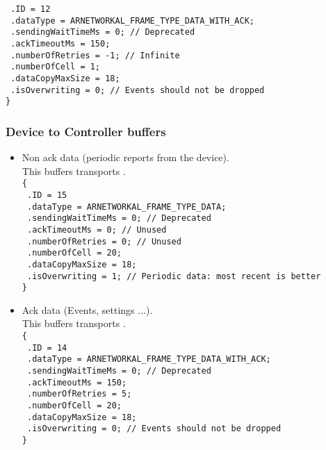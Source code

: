 \begin{itemize}
{    \texttt{  .ID = 12}\\
    \texttt{  .dataType = ARNETWORKAL\_FRAME\_TYPE\_DATA\_WITH\_ACK;}\\
    \texttt{  .sendingWaitTimeMs = 0; // Deprecated}\\
    \texttt{  .ackTimeoutMs = 150;}\\
    \texttt{  .numberOfRetries = -1; // Infinite}\\
    \texttt{  .numberOfCell = 1;}\\
    \texttt{  .dataCopyMaxSize = 18;}\\
    \texttt{  .isOverwriting = 0; // Events should not be dropped}\\
    \texttt{\}}
}
\end{itemize}


\subsubsection*{Device to Controller buffers}
\begin{itemize}
\item{
    Non ack data (periodic reports from the device).\\
    This buffers transports .\\
    \texttt{\{}\\
    \texttt{  .ID = 15}\\
    \texttt{  .dataType = ARNETWORKAL\_FRAME\_TYPE\_DATA;}\\
    \texttt{  .sendingWaitTimeMs = 0; // Deprecated}\\
    \texttt{  .ackTimeoutMs = 0; // Unused}\\
    \texttt{  .numberOfRetries = 0; // Unused}\\
    \texttt{  .numberOfCell = 20;}\\
    \texttt{  .dataCopyMaxSize = 18;}\\
    \texttt{  .isOverwriting = 1; // Periodic data: most recent is better}\\
    \texttt{\}}
}
\item{
    Ack data (Events, settings ...).\\
    This buffers transports .\\
    \texttt{\{}\\
    \texttt{  .ID = 14}\\
    \texttt{  .dataType = ARNETWORKAL\_FRAME\_TYPE\_DATA\_WITH\_ACK;}\\
    \texttt{  .sendingWaitTimeMs = 0; // Deprecated}\\
    \texttt{  .ackTimeoutMs = 150;}\\
    \texttt{  .numberOfRetries = 5;}\\
    \texttt{  .numberOfCell = 20;}\\
    \texttt{  .dataCopyMaxSize = 18;}\\
    \texttt{  .isOverwriting = 0; // Events should not be dropped}\\
    \texttt{\}}
}
\end{itemize}


